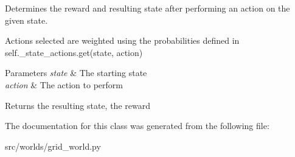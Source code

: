 Determines the reward and resulting state after performing an action on the given state. 

Actions selected are weighted using the probabilities defined in self.\+\_\+state\+\_\+actions.\+get(state, action)


\begin{DoxyParams}{Parameters}
{\em state} & The starting state \\
\hline
{\em action} & The action to perform \\
\hline
\end{DoxyParams}
\begin{DoxyReturn}{Returns}
the resulting state, the reward 
\end{DoxyReturn}


The documentation for this class was generated from the following file\+:\begin{DoxyCompactItemize}
\item 
src/worlds/grid\+\_\+world.\+py\end{DoxyCompactItemize}
